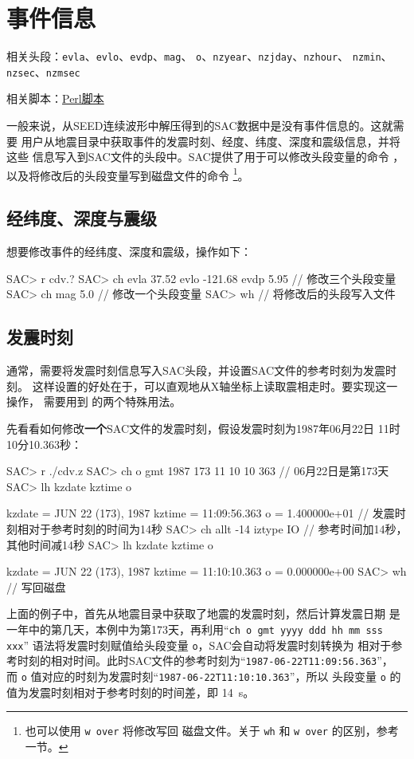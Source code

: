 \section{事件信息}
\label{sec:event-info}
相关头段：\texttt{evla}、\texttt{evlo}、\texttt{evdp}、\texttt{mag}、
    \texttt{o}、\texttt{nzyear}、\texttt{nzjday}、\texttt{nzhour}、
    \texttt{nzmin}、\texttt{nzsec}、\texttt{nzmsec}

相关脚本：\hyperref[subsec:event-info-perl]{Perl脚本}

一般来说，从SEED连续波形中解压得到的SAC数据中是没有事件信息的。这就需要
用户从地震目录中获取事件的发震时刻、经度、纬度、深度和震级信息，并将这些
信息写入到SAC文件的头段中。SAC提供了用于可以修改头段变量的命令
，以及将修改后的头段变量写到磁盘文件的命令
\footnote{也可以使用 \texttt{w over} 将修改写回
磁盘文件。关于 \texttt{wh} 和 \texttt{w over} 的区别，参考
 一节。}。

\subsection{经纬度、深度与震级}
想要修改事件的经纬度、深度和震级，操作如下：
\begin{SACCode}
SAC> r cdv.?
SAC> ch evla 37.52 evlo -121.68 evdp 5.95   // 修改三个头段变量
SAC> ch mag 5.0                             // 修改一个头段变量
SAC> wh                                     // 将修改后的头段写入文件
\end{SACCode}

\subsection{发震时刻}
通常，需要将发震时刻信息写入SAC头段，并设置SAC文件的参考时刻为发震时刻。
这样设置的好处在于，可以直观地从X轴坐标上读取震相走时。要实现这一操作，
需要用到  的两个特殊用法。

先看看如何修改\textbf{一个}SAC文件的发震时刻，假设发震时刻为1987年06月22日
11时10分10.363秒：
\label{code:origin-time}
\begin{SACCode}
SAC> r ./cdv.z
SAC> ch o gmt 1987 173 11 10 10 363   // 06月22日是第173天
SAC> lh kzdate kztime o

     kzdate = JUN 22 (173), 1987
     kztime = 11:09:56.363
          o = 1.400000e+01       // 发震时刻相对于参考时刻的时间为14秒
SAC> ch allt -14 iztype IO       // 参考时间加14秒，其他时间减14秒
SAC> lh kzdate kztime o

     kzdate = JUN 22 (173), 1987
     kztime = 11:10:10.363
          o = 0.000000e+00
SAC> wh                          // 写回磁盘
\end{SACCode}
上面的例子中，首先从地震目录中获取了地震的发震时刻，然后计算发震日期
是一年中的第几天，本例中为第173天，再利用``\texttt{ch o gmt yyyy ddd hh mm sss xxx}''
语法将发震时刻赋值给头段变量 \texttt{o}，SAC会自动将发震时刻转换为
相对于参考时刻的相对时间。此时SAC文件的参考时刻为``\texttt{1987-06-22T11:09:56.363}''，
而 \texttt{o} 值对应的时刻为发震时刻``\texttt{1987-06-22T11:10:10.363}''，所以
头段变量 \texttt{o} 的值为发震时刻相对于参考时刻的时间差，即 \SI{14}{\s}。

